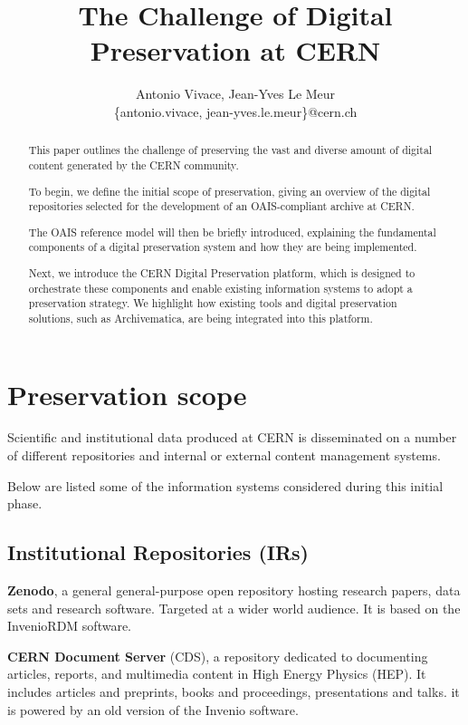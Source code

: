 \documentclass[11pt]{IEEEtran}
\title{ The Challenge of Digital Preservation at CERN }
\author{Antonio Vivace, Jean-Yves Le Meur\\
    \{antonio.vivace, jean-yves.le.meur\}@cern.ch}
\begin{document}
\maketitle

\begin{abstract}
    This paper outlines the challenge of preserving the vast and diverse amount of digital content generated by the CERN community.

    To begin, we define the initial scope of preservation, giving an overview of the digital repositories selected for the development of an OAIS-compliant archive at CERN.

    The OAIS reference model will then be briefly introduced, explaining the fundamental components of a digital preservation system and how they are being implemented.

    Next, we introduce the CERN Digital Preservation platform, which is designed to orchestrate these components and enable existing information systems to adopt a preservation strategy. We highlight how existing tools and digital preservation solutions, such as Archivematica, are being integrated into this platform.

\end{abstract}

\section{Preservation scope}

Scientific and institutional data produced at CERN is disseminated on a number of different repositories and internal or external content management systems.

Below are listed some of the information systems considered during this initial phase.

\subsection{Institutional Repositories (IRs)}

\textbf{Zenodo}, a general general-purpose open repository hosting research papers, data sets and research software. Targeted at a wider world audience. It is based on the InvenioRDM \cite{InvenioRDMinveniosoftwareorg-2023-03-16} software.

\textbf{CERN Document Server} (CDS), a repository dedicated to documenting articles, reports, and multimedia content in High Energy Physics (HEP). It includes articles and preprints, books and proceedings, presentations and talks. it is powered by an old version of the Invenio software.
\end{document}
